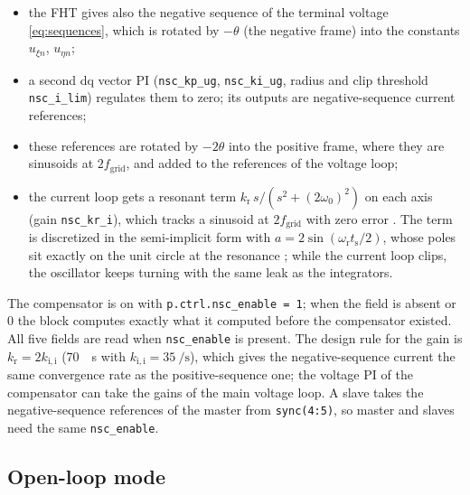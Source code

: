 \documentclass[11pt,a4paper]{scrartcl}
\newcommand{\ped}[1]{_{\mathrm{#1}}}
\newcommand{\code}[1]{\texttt{#1}}
\begin{document}
\begin{onehalfspace}
\begin{itemize}[nosep]
	\item the FHT gives also the negative sequence of the terminal voltage \eqref{eq:sequences}, which is rotated by $-\theta$ (the negative frame) into the constants $u_{\xi n}$, $u_{\eta n}$;
	\item a second dq vector PI (\code{nsc\_kp\_ug}, \code{nsc\_ki\_ug}, radius and clip threshold \code{nsc\_i\_lim}) regulates them to zero; its outputs are negative-sequence current references;
	\item these references are rotated by $-2\theta$ into the positive frame, where they are sinusoids at $2 f\ped{grid}$, and added to the references of the voltage loop;
	\item the current loop gets a resonant term $k\ped{r}\, s/(s^2 + (2\omega\ped{0})^2)$ on each axis (gain \code{nsc\_kr\_i}), which tracks a sinusoid at $2 f\ped{grid}$ with zero error \cite{liserre2006, teodorescu2006}. The term is discretized in the semi-implicit form with $a = 2\sin(\omega\ped{r} t\ped{s}/2)$, whose poles sit exactly on the unit circle at the resonance \cite{yepes2010}; while the current loop clips, the oscillator keeps turning with the same leak as the integrators.
\end{itemize}

\noindent The compensator is on with \code{p.ctrl.nsc\_enable = 1}; when the field is absent or 0 the block computes exactly what it computed before the compensator existed. All five fields are read when \code{nsc\_enable} is present. The design rule for the gain is $k\ped{r} = 2 k\ped{i,i}$ (\SI{70}{\per\second} with $k\ped{i,i} = \SI{35}{\per\second}$), which gives the negative-sequence current the same convergence rate as the positive-sequence one; the voltage PI of the compensator can take the gains of the main voltage loop. A slave takes the negative-sequence references of the master from \code{sync(4:5)}, so master and slaves need the same \code{nsc\_enable}.

\subsection{Open-loop mode}
\label{sec:open_loop}


\end{onehalfspace}
\end{document}
